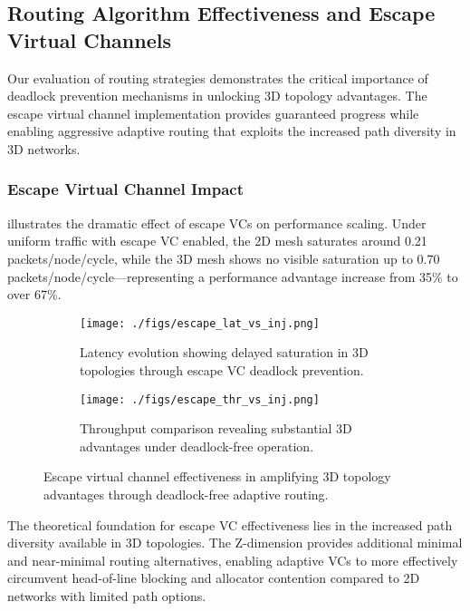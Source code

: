 \documentclass[11pt]{article}
\begin{document}
\subsection{Routing Algorithm Effectiveness and Escape Virtual Channels}

Our evaluation of routing strategies demonstrates the critical importance of deadlock prevention mechanisms in unlocking 3D topology advantages. The escape virtual channel implementation provides guaranteed progress while enabling aggressive adaptive routing that exploits the increased path diversity in 3D networks.

\subsubsection{Escape Virtual Channel Impact}

 illustrates the dramatic effect of escape VCs on performance scaling. Under uniform traffic with escape VC enabled, the 2D mesh saturates around 0.21 packets/node/cycle, while the 3D mesh shows no visible saturation up to 0.70 packets/node/cycle—representing a performance advantage increase from 35\% to over 67\%.

\begin{figure}[htbp]
  \centering
  \begin{subfigure}[t]{0.48\linewidth}
    \centering
    \texttt{[image: ./figs/escape\_lat\_vs\_inj.png]}
    \caption{Latency evolution showing delayed saturation in 3D topologies through escape VC deadlock prevention.}
  \end{subfigure}\hfill
  \begin{subfigure}[t]{0.48\linewidth}
    \centering
    \texttt{[image: ./figs/escape\_thr\_vs\_inj.png]}
    \caption{Throughput comparison revealing substantial 3D advantages under deadlock-free operation.}
  \end{subfigure}
  \caption{Escape virtual channel effectiveness in amplifying 3D topology advantages through deadlock-free adaptive routing.}
  \label{fig:escape-vc-results}
\end{figure}

The theoretical foundation for escape VC effectiveness lies in the increased path diversity available in 3D topologies. The Z-dimension provides additional minimal and near-minimal routing alternatives, enabling adaptive VCs to more effectively circumvent head-of-line blocking and allocator contention compared to 2D networks with limited path options.
\end{document}
